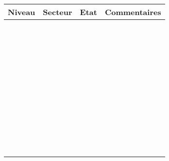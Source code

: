 \documentclass[a4paper]{article}
\begin{document}
\begin{minipage}{9cm}
\renewcommand{\arraystretch}{.8}
\begin{tabular}{|p{1cm}|p{2.2cm}|p{.7cm}|p{3cm}|}
\hline
Niveau & Secteur & Etat & Commentaires \\
\hline
&&&\\
&&&\\
\hline
&&&\\
&&&\\
\hline
&&&\\
&&&\\
\hline
&&&\\
&&&\\
\hline
&&&\\
&&&\\
\hline
&&&\\
&&&\\
\hline
&&&\\
&&&\\
\hline
&&&\\
&&&\\
\hline
&&&\\
&&&\\
\hline
&&&\\
&&&\\
\hline
&&&\\
&&&\\
\hline
&&&\\
&&&\\
\hline
&&&\\
&&&\\
\hline
&&&\\
&&&\\
\hline
&&&\\
&&&\\
\hline
&&&\\
&&&\\
\hline
&&&\\
&&&\\
\hline
&&&\\
&&&\\
\hline
&&&\\
&&&\\
\hline
&&&\\
&&&\\
\hline
&&&\\
&&&\\
\hline
&&&\\
&&&\\
\hline
&&&\\
&&&\\
\hline
&&&\\

\end{tabular}
\end{minipage}
\end{document}
